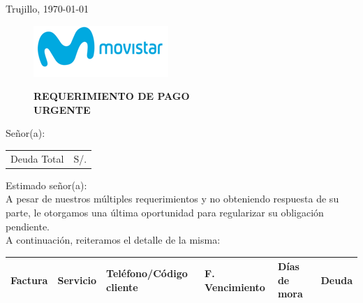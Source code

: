 %
%

\begin{flushright}
    Trujillo, \today
\end{flushright}
\vspace{-0.5cm}

\begin{figure}[h]
\begin{minipage}[b]{5.106458333cm}
\includegraphics[natwidth=5.106458333cm, natheight=1.931458333cm]{resources/business_logo.png}
\end{minipage}
\begin{minipage}[b][1.9314cm][t]{11cm}
\begin{flushright}
{\LARGE \bf REQUERIMIENTO DE PAGO\\URGENTE}
\end{flushright}
\end{minipage}
\end{figure}

\noindent
Señor(a):\\

\begin{flushright}
\bf \large
\begin{tabular}{|p{3.2cm} p{3.2cm}|}
\hline
Deuda Total & S/. %
\hline
\end{tabular}
\end{flushright}

\noindent
Estimado señor(a):\\
A pesar de nuestros múltiples requerimientos y no obteniendo respuesta de su parte, le otorgamos una última oportunidad para regularizar su obligación pendiente.\\

\noindent A continuación, reiteramos el detalle de la misma:
\begin{center}
\scriptsize
\begin{tabular}{|x{1.2cm}|x{2cm}|x{3.5cm}|x{2.5cm}|x{2cm}|x{2cm}|}
\hline
\textbf{Factura} & \textbf{Servicio} & \textbf{Teléfono/Código cliente} & \textbf{F. Vencimiento} & \textbf{Días de mora} & \textbf{Deuda} \\
\hline
\hline
\end{tabular}
\end{center}

